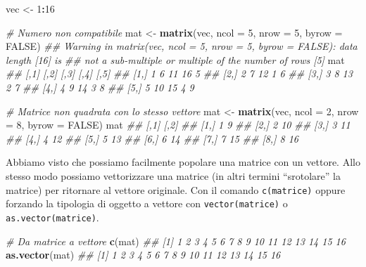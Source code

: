 \documentclass[
]{book}
\newenvironment{Shaded}{\begin{snugshade}}{\end{snugshade}}
\newcommand{\CommentTok}[1]{\textcolor[rgb]{0.56,0.35,0.01}{\textit{#1}}}
\newcommand{\DataTypeTok}[1]{\textcolor[rgb]{0.13,0.29,0.53}{#1}}
\newcommand{\DecValTok}[1]{\textcolor[rgb]{0.00,0.00,0.81}{#1}}
\newcommand{\KeywordTok}[1]{\textcolor[rgb]{0.13,0.29,0.53}{\textbf{#1}}}
\newcommand{\NormalTok}[1]{#1}
\newcommand{\OperatorTok}[1]{\textcolor[rgb]{0.81,0.36,0.00}{\textbf{#1}}}
\newcommand{\OtherTok}[1]{\textcolor[rgb]{0.56,0.35,0.01}{#1}}
\newcommand{\StringTok}[1]{\textcolor[rgb]{0.31,0.60,0.02}{#1}}
\begin{document}
\begin{Shaded}
\begin{Highlighting}[]
\NormalTok{vec <-}\StringTok{ }\DecValTok{1}\OperatorTok{:}\DecValTok{16}

\CommentTok{# Numero non compatibile}
\NormalTok{mat <-}\StringTok{ }\KeywordTok{matrix}\NormalTok{(vec, }\DataTypeTok{ncol =} \DecValTok{5}\NormalTok{, }\DataTypeTok{nrow =} \DecValTok{5}\NormalTok{, }\DataTypeTok{byrow =} \OtherTok{FALSE}\NormalTok{)}
\CommentTok{## Warning in matrix(vec, ncol = 5, nrow = 5, byrow = FALSE): data length [16] is}
\CommentTok{## not a sub-multiple or multiple of the number of rows [5]}
\NormalTok{mat}
\CommentTok{##      [,1] [,2] [,3] [,4] [,5]}
\CommentTok{## [1,]    1    6   11   16    5}
\CommentTok{## [2,]    2    7   12    1    6}
\CommentTok{## [3,]    3    8   13    2    7}
\CommentTok{## [4,]    4    9   14    3    8}
\CommentTok{## [5,]    5   10   15    4    9}

\CommentTok{# Matrice non quadrata con lo stesso vettore}
\NormalTok{mat <-}\StringTok{ }\KeywordTok{matrix}\NormalTok{(vec, }\DataTypeTok{ncol =} \DecValTok{2}\NormalTok{, }\DataTypeTok{nrow =} \DecValTok{8}\NormalTok{, }\DataTypeTok{byrow =} \OtherTok{FALSE}\NormalTok{)}
\NormalTok{mat}
\CommentTok{##      [,1] [,2]}
\CommentTok{## [1,]    1    9}
\CommentTok{## [2,]    2   10}
\CommentTok{## [3,]    3   11}
\CommentTok{## [4,]    4   12}
\CommentTok{## [5,]    5   13}
\CommentTok{## [6,]    6   14}
\CommentTok{## [7,]    7   15}
\CommentTok{## [8,]    8   16}
\end{Highlighting}
\end{Shaded}

Abbiamo visto che possiamo facilmente popolare una matrice con un vettore. Allo stesso modo possiamo vettorizzare una matrice (in altri termini ``srotolare'' la matrice) per ritornare al vettore originale. Con il comando \texttt{c(matrice)} oppure forzando la tipologia di oggetto a vettore con \texttt{vector(matrice)} o \texttt{as.vector(matrice)}.

\begin{Shaded}
\begin{Highlighting}[]
\CommentTok{# Da matrice a vettore}
\KeywordTok{c}\NormalTok{(mat)}
\CommentTok{##  [1]  1  2  3  4  5  6  7  8  9 10 11 12 13 14 15 16}
\KeywordTok{as.vector}\NormalTok{(mat)}
\CommentTok{##  [1]  1  2  3  4  5  6  7  8  9 10 11 12 13 14 15 16}
\end{Highlighting}
\end{Shaded}
\end{document}
